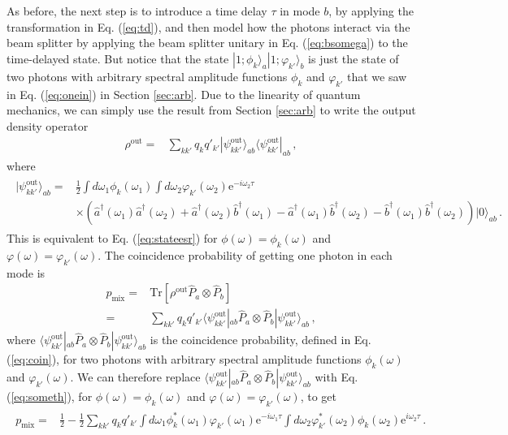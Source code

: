 \documentclass[12pt]{article}
\newcommand{\ket}[2] {| #1 \rangle_{#2}}
\newcommand{\bra}[2] {\langle #1 |_{#2}}
\newcommand{\dg}{^{\dagger}}
\newcommand{\ee}[1] {\mathrm{e}^{#1}}
\begin{document}
As before, the next step is to introduce a time delay $\tau$ in mode $b$, by applying the transformation in Eq. (\ref{eq:td}), and then model how the photons interact via the beam splitter by applying the beam splitter unitary in Eq. (\ref{eq:bsomega}) to the time-delayed state. But notice that the state $\ket{1;\phi_{k}}{a}\ket{1;\varphi_{k'}}{b}$ is just the state of two photons with arbitrary spectral amplitude functions $\phi_{k}$ and $\varphi_{k'}$ that we saw in Eq. (\ref{eq:onein}) in Section \ref{sec:arb}. Due to the linearity of quantum mechanics, we can simply use the result from Section \ref{sec:arb} to write the output density operator 
\begin{align}
\rho^{\mathrm{out}}={}&\sum_{kk'}q_{k}q'_{k'}\ket{\psi_{kk'}^{\mathrm{out}}}{ab}\bra{\psi_{kk'}^{\mathrm{out}}}{ab}\,,
\end{align}
where
\begin{align}
\begin{split}
\ket{\psi_{kk'}^{\mathrm{out}}}{ab}={}&\frac{1}{2}\int d\omega_{1} \phi_k(\omega_{1})\int d\omega_{2} \varphi_{k'}(\omega_{2})\ee{-i\omega_{2} \tau}\\
&\times\left(\hat{a}\dg(\omega_{1})\hat{a}\dg(\omega_{2})+\hat{a}\dg(\omega_{2})\hat{b}\dg(\omega_{1})-\hat{a}\dg(\omega_{1})\hat{b}\dg(\omega_{2})-\hat{b}\dg(\omega_{1})\hat{b}\dg(\omega_{2})\right)\ket{0}{ab}\,.
\end{split}
\end{align}
This is equivalent to Eq. (\ref{eq:stateesr}) for $\phi(\omega)=\phi_{k}(\omega)$ and $\varphi(\omega)=\varphi_{k'}(\omega)$. The coincidence probability of getting one photon in each mode is 
\begin{align}
p_{\mathrm{mix}}={}&\mathrm{Tr}[\rho^{\mathrm{out}}\hat{P}_{a}\otimes\hat{P}_{b}]\\
={}&\sum_{kk'}q_{k}q'_{k'}\bra{\psi_{kk'}^{\mathrm{out}}}{ab}\hat{P}_{a}\otimes\hat{P}_{b}\ket{\psi_{kk'}^{\mathrm{out}}}{ab}\,,
\end{align}
where $\bra{\psi_{kk'}^{\mathrm{out}}}{ab}\hat{P}_{a}\otimes\hat{P}_{b}\ket{\psi_{kk'}^{\mathrm{out}}}{ab}$ is the coincidence probability, defined in Eq. (\ref{eq:coin}), for two photons with arbitrary spectral amplitude functions $\phi_{k}(\omega)$ and $\varphi_{k'}(\omega)$. We can therefore replace $\bra{\psi_{kk'}^{\mathrm{out}}}{ab}\hat{P}_{a}\otimes\hat{P}_{b}\ket{\psi_{kk'}^{\mathrm{out}}}{ab}$ with Eq. (\ref{eq:someth}), for $\phi(\omega)=\phi_{k}(\omega)$ and $\varphi(\omega)=\varphi_{k'}(\omega)$, to get 
\begin{align}\label{eq:mixp}
\begin{split}
p_{\mathrm{mix}}={}&\frac{1}{2}-\frac{1}{2}\sum_{kk'}q_{k}q'_{k'}\int d\omega_{1}\phi_{k}^*(\omega_{1})\varphi_{k'}(\omega_{1}) \ee{-i\omega_{1} \tau}\int d\omega_{2}\varphi_{k'}^*(\omega_{2}) \phi_{k}(\omega_{2}) \ee{i\omega_2 \tau}\,.
\end{split}
\end{align}
\end{document}
